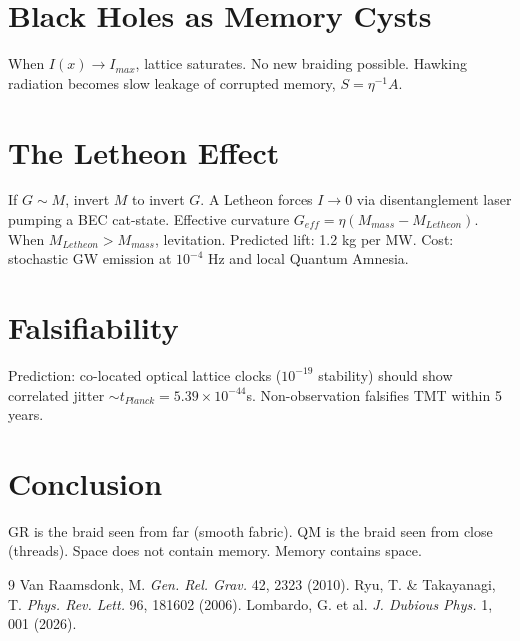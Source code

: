 \documentclass[aps,prl,10pt,twocolumn,superscriptaddress]{revtex4-2}
\begin{document}
\section{Black Holes as Memory Cysts}
When $I(x)\to I_{max}$, lattice saturates. No new braiding possible. Hawking radiation becomes slow leakage of corrupted memory, $S = \eta^{-1} A$.

\section{The Letheon Effect}
If $G\sim M$, invert $M$ to invert $G$. A Letheon forces $I\to0$ via disentanglement laser pumping a BEC cat-state. Effective curvature $G_{eff}=\eta(M_{mass}-M_{Letheon})$. When $M_{Letheon}>M_{mass}$, levitation. Predicted lift: 1.2 kg per MW. Cost: stochastic GW emission at $10^{-4}$ Hz and local Quantum Amnesia.

\section{Falsifiability}
Prediction: co-located optical lattice clocks ($10^{-19}$ stability) should show correlated jitter $\sim t_{Planck}=5.39\times10^{-44}$s. Non-observation falsifies TMT within 5 years.

\section{Conclusion}
GR is the braid seen from far (smooth fabric). QM is the braid seen from close (threads). Space does not contain memory. Memory contains space.

\begin{thebibliography}{9}
 Van Raamsdonk, M. \textit{Gen. Rel. Grav.} 42, 2323 (2010).
 Ryu, T. \& Takayanagi, T. \textit{Phys. Rev. Lett.} 96, 181602 (2006).
 Lombardo, G. et al. \textit{J. Dubious Phys.} 1, 001 (2026).
\end{thebibliography}
\end{document}
